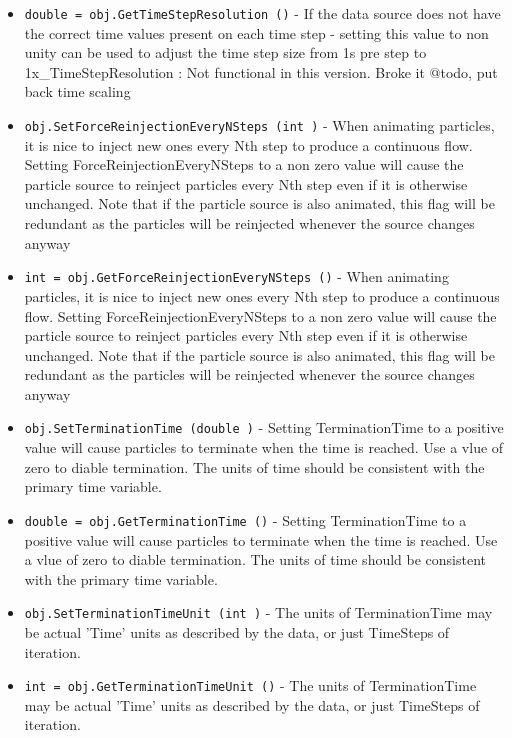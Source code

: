 \begin{itemize}
\item  \verb|double = obj.GetTimeStepResolution ()| -  If the data source does not have the correct time values 
 present on each time step - setting this value to non unity can
 be used to adjust the time step size from 1s pre step to
 1x\_TimeStepResolution : Not functional in this version. 
 Broke it @todo, put back time scaling

\item  \verb|obj.SetForceReinjectionEveryNSteps (int )| -  When animating particles, it is nice to inject new ones every Nth step
 to produce a continuous flow. Setting ForceReinjectionEveryNSteps to a 
 non zero value will cause the particle source to reinject particles
 every Nth step even if it is otherwise unchanged.
 Note that if the particle source is also animated, this flag will be
 redundant as the particles will be reinjected whenever the source changes 
 anyway

\item  \verb|int = obj.GetForceReinjectionEveryNSteps ()| -  When animating particles, it is nice to inject new ones every Nth step
 to produce a continuous flow. Setting ForceReinjectionEveryNSteps to a 
 non zero value will cause the particle source to reinject particles
 every Nth step even if it is otherwise unchanged.
 Note that if the particle source is also animated, this flag will be
 redundant as the particles will be reinjected whenever the source changes 
 anyway

\item  \verb|obj.SetTerminationTime (double )| -  Setting TerminationTime to a positive value will cause particles
 to terminate when the time is reached. Use a vlue of zero to
 diable termination. The units of time should be consistent with the 
 primary time variable.

\item  \verb|double = obj.GetTerminationTime ()| -  Setting TerminationTime to a positive value will cause particles
 to terminate when the time is reached. Use a vlue of zero to
 diable termination. The units of time should be consistent with the 
 primary time variable.

\item  \verb|obj.SetTerminationTimeUnit (int )| -  The units of TerminationTime may be actual 'Time' units as described
 by the data, or just TimeSteps of iteration.

\item  \verb|int = obj.GetTerminationTimeUnit ()| -  The units of TerminationTime may be actual 'Time' units as described
 by the data, or just TimeSteps of iteration.


\end{itemize}
